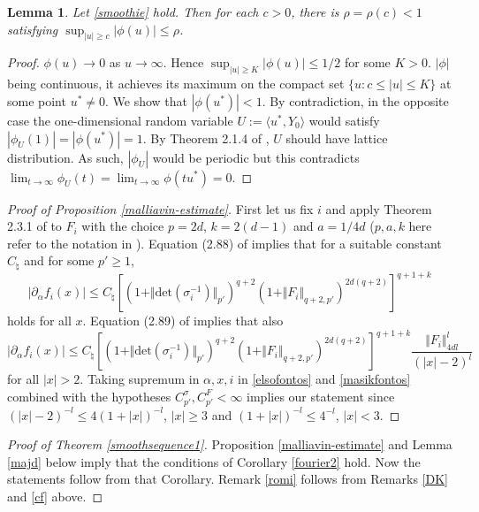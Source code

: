 \documentclass{article}
\newtheorem{lemma}[theorem]{Lemma}
\begin{document}
\begin{lemma}\label{sublemma} Let \eqref{smoothie} hold. Then for each $c>0$,
there is $\rho=\rho(c)<1$ satisfying $\sup_{|u|\geq c}|\phi(u)|\leq \rho$.	
\end{lemma}
\begin{proof}
$\phi(u)\to 0$ as $u\to\infty$. Hence $\sup_{|u|\geq K}|\phi(u)|\leq 1/2$
for some $K>0$. $|\phi|$ being continuous, it achieves its maximum on the compact set 
$\{u:c\leq |u|\leq K\}$ at some point $u^{*}\neq 0$. We show that $|\phi(u^{*})|<1$.
By contradiction, in the opposite case the one-dimensional random variable $U:=\langle u^{*},Y_{0}\rangle${}
would satisfy $|\phi_{U}(1)|=|\phi(u^{*})|=1$. By Theorem 2.1.4 of
\cite{lukacs}, $U$ should have lattice distribution. As such, $|\phi_{U}|$ would be periodic but
this contradicts $\lim_{t\to\infty}\phi_{U}(t)=\lim_{t\to\infty}\phi(tu^{*})=0$. 
\end{proof}


\begin{proof}[Proof of Proposition \ref{malliavin-estimate}] First let us fix $i$ and apply Theorem 2.3.1 of \cite{bally} to $F_{i}$ with the
choice $p=2d$, $k=2(d-1)$ and $a=1/4d$ ($p,a,k$ here refer to the notation in \cite{bally}). Equation (2.88) of 
\cite{bally} implies
that for a suitable constant $C_{\natural}{}$ and for some $p'\geq 1$,
\begin{equation}\label{elsofontos}
|\partial_{\alpha} f_{i}(x)|\leq C_{\natural}\left[\left(1+\Vert\mathrm{det}(\sigma_{i}^{-1})\Vert_{p'}\right)^{q+2}
\left(1+\Vert F_{i}\Vert_{q+2,p'}\right)^{2d(q+2)}\right]^{q+1+k}
\end{equation}
holds for all $x$. Equation (2.89) of \cite{bally} implies that also
\begin{equation}\label{masikfontos}
|\partial_{\alpha} f_{i}(x)|\leq C_{\natural}\left[\left(1+\Vert \mathrm{det}(\sigma_{i}^{-1})\Vert_{p'}\right)^{q+2}
\left(1+\Vert F_{i}\Vert_{q+2,p'}\right)^{2d(q+2)}\right]^{q+1+k}\frac{\Vert F_{i}\Vert_{4dl}^{l}}{(|x|-2)^{l}}
\end{equation}
for all $|x|>2$. 
Taking supremum in $\alpha,x,i$ in \eqref{elsofontos} and \eqref{masikfontos} combined
with the hypotheses $C_{p'}^{\sigma},C_{p'}^{F}<\infty$ implies our statement since 
$(|x|-2)^{-l}\leq 4(1+|x|)^{-l}$, $|x|\geq 3$ and $(1+|x|)^{-l}\leq 4^{-l}$, $|x|<3$. 
\end{proof}

\begin{proof}[Proof of Theorem \ref{smoothsequence1}]
Proposition \ref{malliavin-estimate} and Lemma \ref{majd} below imply that the conditions
of Corollary \ref{fourier2} hold. Now the statements follow from that Corollary. Remark 
\ref{romi} follows from
Remarks \ref{DK} and \ref{cf} above.	
\end{proof}
\end{document}
